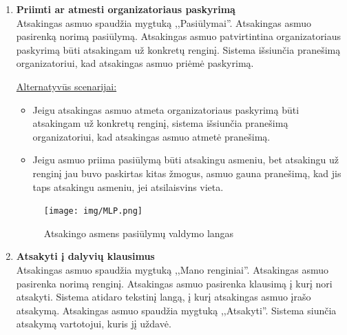 \documentclass{VUMIFPSkursinis}
\begin{document}
\begin{enumerate} [label = \textbf{U\arabic*.}]
				\underline{Alternatyvūs scenarijai:}
				\begin{itemize}
					\item Jeigu nėra prašančiųjų dalyvauti, sistemoje iššoka langas sakantis organizatoriui, jog nėra naujų patvirtinimų.
					\item Jeigu dalyvis yra priimamas į renginį, bet nebėra vietų dalyvauti, jam išsiunčiama žinutė, jog jei atsiras laisvų vietų, jis bus priimtas į renginį.
				\end{itemize}
				
				\begin{figure}[H]
					\centering
					\texttt{[image: img/MLP.png]}
					\caption{Prašymo dalyvauti peržiūra}
					\label{fig:priimti-dalyvi}
				\end{figure}

			\item \textbf{Priimti ar atmesti organizatoriaus paskyrimą} \\
				Atsakingas asmuo spaudžia mygtuką ,,Pasiūlymai''. 
				Atsakingas asmuo pasirenką norimą pasiūlymą.
				Atsakingas asmuo patvirtintina organizatoriaus paskyrimą būti atsakingam už konkretų renginį. 
				Sistema išsiunčia pranešimą organizatoriui, kad atsakingas asmuo priėmė paskyrimą.
				
				\underline{Alternatyvūs scenarijai:}
				\begin{itemize}
					\item Jeigu atsakingas asmuo atmeta organizatoriaus paskyrimą būti atsakingam už konkretų renginį, sistema išsiunčia pranešimą organizatoriui, kad atsakingas asmuo atmetė pranešimą.
					\item Jeigu asmuo priima pasiūlymą būti atsakingu asmeniu, bet atsakingu už renginį jau buvo paskirtas kitas žmogus, asmuo gauna pranešimą, kad jis taps atsakingu asmeniu, jei atsilaisvins vieta.
				\end{itemize}

				\begin{figure}[H]
					\centering
					\texttt{[image: img/MLP.png]}
					\caption{Atsakingo asmens pasiūlymų valdymo langas}
					\label{fig:pasiulymu-sarasas}
				\end{figure}
			\item \textbf{Atsakyti į dalyvių klausimus}   \\
					Atsakingas asmuo spaudžia mygtuką ,,Mano renginiai''. 
					Atsakingas asmuo pasirenka norimą renginį.
					Atsakingas asmuo pasirenka klausimą į kurį nori atsakyti. 
					Sistema atidaro tekstinį langą, į kurį atsakingas asmuo įrašo atsakymą. 
					Atsakingas asmuo spaudžia mygtuką ,,Atsakyti''.
					Sistema siunčia atsakymą vartotojui, kuris jį uždavė.
					

\end{enumerate}
\end{document}
